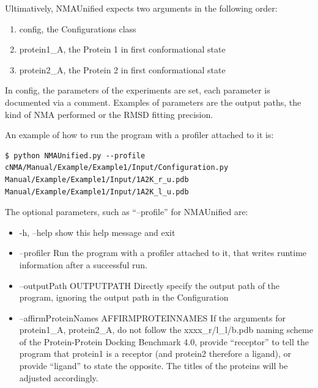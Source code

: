\documentclass[11pt]{article}
\begin{document}
Ultimatively, NMAUnified expects two arguments in the following order:
\begin{enumerate}
 \item config, the Configurations class
 \item protein1\_A, the Protein 1 in first conformational state
 \item protein2\_A, the Protein 2 in first conformational state
\end{enumerate}

In config, the parameters of the experiments are set, each parameter is documented via a comment. Examples of parameters are the output paths, 
the kind of NMA performed or the RMSD fitting precision.

An example of how to run the program with a profiler attached to it is:

\begin{lstlisting}
$ python NMAUnified.py --profile cNMA/Manual/Example/Example1/Input/Configuration.py Manual/Example/Example1/Input/1A2K_r_u.pdb Manual/Example/Example1/Input/1A2K_l_u.pdb
\end{lstlisting}

The optional parameters, such as ``--profile'' for NMAUnified are:

\begin{itemize}
 \item -h, --help            show this help message and exit
 \item --profiler            Run the program with a profiler attached to it, that
						writes runtime information after a successful run.
 \item --outputPath OUTPUTPATH
						Directly specify the output path of the program,
						ignoring the output path in the Configuration
 \item --affirmProteinNames AFFIRMPROTEINNAMES
						If the arguments for protein1\_A, protein2\_A,
						do not follow the xxxx\_r/l\_l/b.pdb naming scheme of
						the Protein-Protein Docking Benchmark 4.0, provide 
						``receptor'' to tell the program that protein1 is a 
						receptor (and protein2 therefore a ligand), or provide
						``ligand'' to state the opposite. The titles of the proteins 
						will be adjusted accordingly.
\end{itemize}
\end{document}

